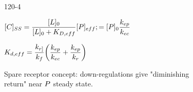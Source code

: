 \begin{mitframe}{120-4}
\begin{listone}
  \item $[\conc]_{\entropy\entropy}=\dfrac{[\length]_{\init}}{[\length]_{\init}+\dilfac_{\elecdisplace,eff}}[\p]_{eff};=[\p]_{\init}\dfrac{\thermcond_{ep}}{\thermcond_{ec}}$
  \item $\dilfac_{d,eff}=\dfrac{\thermcond_{\pos]}}{\thermcond_{\fug}}\bigg(\dfrac{\thermcond_{ep}}{\thermcond_{ec}}+\dfrac{\thermcond_{ep}}{\thermcond_{\pos}}\bigg)$
  \item Spare receptor concept: down-regulations give "diminishing \\ 
  return" near $\p$ steady state.
\end{listone}        
\end{mitframe}